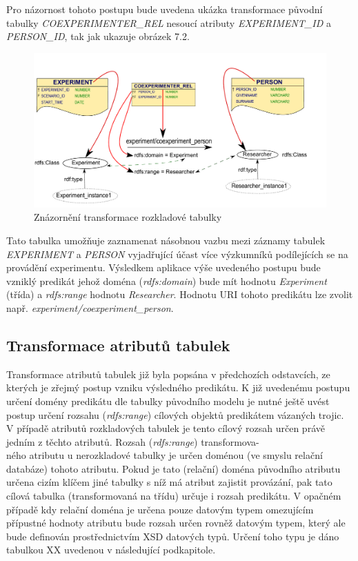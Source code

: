 \documentclass{projekt}
\begin{document}
Pro názornost tohoto postupu bude uvedena ukázka transformace původní tabulky {\it COEXPERIMENTER\_REL} nesoucí atributy {\it EXPERIMENT\_ID} a {\it PERSON\_ID}, tak jak ukazuje obrázek 7.2.


\begin{figure}[htb]
\begin{center}
\includegraphics[scale=0.5]{rozkladovka.pdf}
\caption{Znázornění transformace rozkladové tabulky}
\end{center}
\end{figure}


Tato tabulka umožňuje zaznamenat násobnou vazbu mezi záznamy tabulek {\it EXPERIMENT} a {\it PERSON} vyjadřující účast více výzkumníků podílejících se na provádění experimentu. Výsledkem aplikace výše uvedeného postupu bude vzniklý predikát jehož doména ({\it rdfs:domain}) bude mít hodnotu {\it Experiment} (třída) a {\it rdfs:range} hodnotu {\it Researcher}. Hodnotu URI tohoto predikátu lze zvolit např. {\it experiment/coexperiment\_person}.


\subsection{Transformace atributů tabulek}
\hspace{0.65cm}Transformace atributů tabulek již byla popsána v předchozích odstavcích, ze kterých je zřejmý postup vzniku výsledného predikátu. K již uvedenému postupu určení domény predikátu dle tabulky původního modelu je nutné ještě uvést postup určení rozsahu ({\it rdfs:range}) cílových objektů predikátem vázaných trojic. V případě atributů rozkladových tabulek je tento cílový rozsah určen právě jedním z těchto atributů. Rozsah ({\it rdfs:range})  transformova-\\ného atributu u nerozkladové tabulky je určen doménou (ve smyslu relační databáze) tohoto atributu. Pokud je tato (relační) doména původního atributu určena cizím klíčem jiné tabulky s níž má atribut zajistit provázání, pak tato cílová tabulka (transformovaná na třídu) určuje i rozsah predikátu. V opačném případě kdy relační doména je určena pouze datovým typem omezujícím přípustné hodnoty atributu bude rozsah určen rovněž datovým typem, který ale bude definován prostřednictvím XSD datových typů. Určení toho typu je dáno tabulkou XX uvedenou v následující podkapitole.
\end{document}

